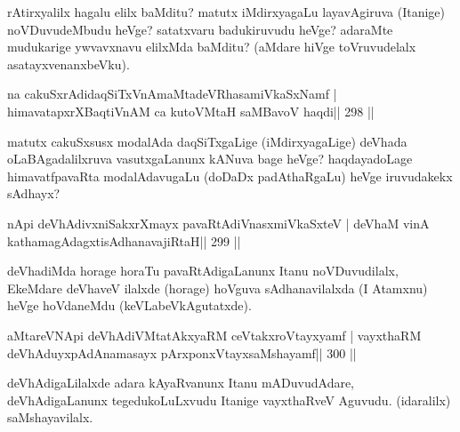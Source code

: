 \begin{artha}
rAtirxyalilx hagalu elilx baMditu? matutx iMdirxyagaLu layavAgiruva (Itanige) noVDuvudeMbudu heVge? satatxvaru badukiruvudu heVge? adaraMte mudukarige ywvavxnavu elilxMda baMditu? (aMdare hiVge toVruvudelalx asatayxvenanxbeVku).
\end{artha}


\begin{shl}
na cakuSxrAdidaqSiTxVnAmaMtadeVRhasamiVkaSxNamf |
himavatapxrXBaqtiVnAM ca kutoV\s MtaH saMBavoV haqdi\hfill || 298 ||
\end{shl}

\begin{artha}
matutx cakuSxsusx modalAda daqSiTxgaLige (iMdirxyagaLige) deVhada oLaBAgadalilxruva vasutxgaLanunx kANuva bage heVge? haqdayadoLage himavatfpavaRta modalAdavugaLu (doDaDx padAthaRgaLu) heVge iruvudakekx sAdhayx?
\end{artha}


\begin{shl}
nApi deVhAdivxniSakxrXmayx pavaRtAdiVnasxmiVkaSxteV |
deVhaM vinA kathamagAdagxtisAdhanavajiRtaH\hfill || 299 ||
\end{shl}

\begin{artha}
deVhadiMda horage horaTu pavaRtAdigaLanunx Itanu noVDuvudilalx, EkeMdare deVhaveV ilalxde (horage) hoVguva sAdhanavilalxda (I Atamxnu) heVge hoVdaneMdu (keVLabeVkAgutatxde).
\end{artha}


\begin{shl}
aMtareVNApi deVhAdiVMtatAkxyaRM ceVtakxroVtayxyamf |
vayxthaRM deVhAduyxpAdAnamasayx pArxponxVtayxsaMshayamf\hfill || 300 ||
\end{shl}

\begin{artha}
deVhAdigaLilalxde adara kAyaRvanunx Itanu mADuvudAdare, deVhAdigaLanunx tegedukoLuLxvudu Itanige vayxthaRveV Aguvudu. (idaralilx) saMshayavilalx.
\end{artha}


